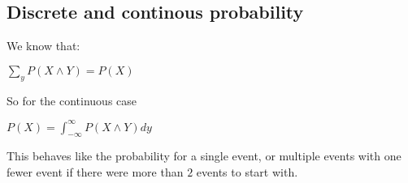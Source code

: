 
\subsection{Discrete and continous probability}

We know that:

\(\sum_yP(X\land Y)=P(X)\)

So for the continuous case

\(P(X)=\int_{-\infty }^{\infty }P(X\land Y)dy\)

This behaves like the probability for a single event, or multiple events with one fewer event if there were more than \(2\) events to start with.

